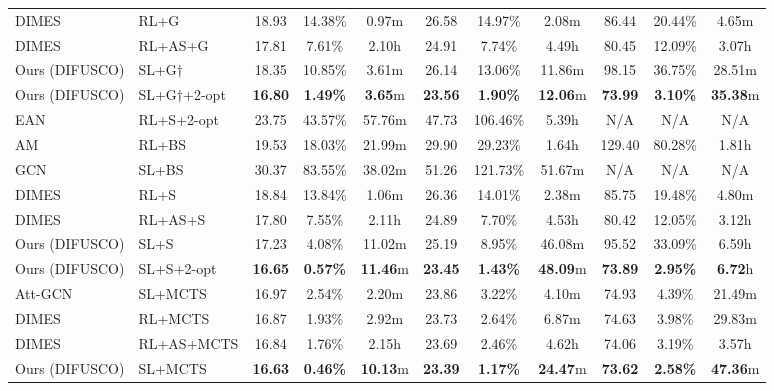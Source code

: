 \documentclass{article}
\theoremstyle{plain}
\theoremstyle{definition}
\theoremstyle{remark}
\newcommand{\method}{DIFUSCO}
\begin{document}
\begin{table}[t]
\begin{sc}
\begin{center}
{\begin{tabular}{ll|ccc|ccc|ccc}
DIMES &RL+G
&18.93 &14.38\% &0.97$\mathrm{m}$ & 26.58 & 14.97\% & 2.08$\mathrm{m}$ & 86.44 & 20.44\% & 4.65$\mathrm{m}$\\%
DIMES &RL+AS+G
&17.81&7.61\%&2.10$\mathrm{h}$&24.91&7.74\%&4.49$\mathrm{h}$        &80.45&12.09\%&3.07$\mathrm{h}$\\
Ours (\method) & SL+G$\dag$& 18.35 & 10.85\% & 3.61$\mathrm{m}$ 
& 26.14 & 13.06\% & 11.86$\mathrm{m}$
& 98.15 & 36.75\% & 28.51$\mathrm{m}$ \\
Ours (\method) & SL+G$\dag$+2-opt& \textbf{16.80} & \textbf{1.49\%} & \textbf{3.65$\mathrm{m}$}
& \textbf{23.56} & \textbf{1.90\%} & \textbf{12.06$\mathrm{m}$}
& \textbf{73.99} & \textbf{3.10\%} & \textbf{35.38$\mathrm{m}$}\\
\midrule
EAN&RL+S+2-opt%
&23.75&43.57\%&57.76$\mathrm{m}$&47.73&106.46\%&5.39$\mathrm{h}$      &N/A&N/A&N/A\\
AM&RL+BS%
&19.53&18.03\%&21.99$\mathrm{m}$&29.90&29.23\%&1.64$\mathrm{h}$       &129.40&80.28\%&1.81$\mathrm{h}$\\
GCN&SL+BS%
&30.37&83.55\%&38.02$\mathrm{m}$&51.26&121.73\%&51.67$\mathrm{m}$     &N/A&N/A&N/A\\
DIMES &RL+S
&18.84 &13.84\% &1.06$\mathrm{m}$ & 26.36 & 14.01\% & 2.38$\mathrm{m}$ & 85.75 &19.48\% & 4.80$\mathrm{m}$\\%
DIMES &RL+AS+S &17.80&7.55\%&2.11$\mathrm{h}$&24.89&7.70\%&4.53$\mathrm{h}$&80.42&12.05\%&3.12$\mathrm{h}$\\
Ours (\method) & SL+S & 17.23 & 4.08\% & 11.02$\mathrm{m}$
& 25.19 & 8.95\% & 46.08$\mathrm{m}$
& 95.52 & 33.09\% & 6.59$\mathrm{h}$ \\
Ours (\method) & SL+S+2-opt& \textbf{16.65} & \textbf{0.57\%} & \textbf{11.46$\mathrm{m}$}
& \textbf{23.45} & \textbf{1.43\%} & \textbf{48.09$\mathrm{m}$}
& \textbf{73.89} & \textbf{2.95\%} & \textbf{6.72$\mathrm{h}$}\\
\midrule
Att-GCN &SL+MCTS & 16.97 & 2.54\% & 2.20$\mathrm{m}$ & 23.86 & 3.22\% & 4.10$\mathrm{m}$ & 74.93 & 4.39\% & 21.49$\mathrm{m}$ \\
DIMES &RL+MCTS
& 16.87 & 1.93\% & 2.92$\mathrm{m}$ & 23.73 & 2.64\% & 6.87$\mathrm{m}$ & 74.63 & 3.98\% & 29.83$\mathrm{m}$\\%
DIMES &RL+AS+MCTS%
&{16.84} &{1.76\%} &2.15$\mathrm{h}$ 
&{23.69} &{2.46\%} &4.62$\mathrm{h}$ 
&{74.06} &{3.19\%} &3.57$\mathrm{h}$ 
\\
Ours (\method) & SL+MCTS
& \textbf{16.63} & \textbf{0.46\%} & \textbf{10.13$\mathrm{m}$}
& \textbf{23.39} & \textbf{1.17\%} & \textbf{24.47$\mathrm{m}$}
& \textbf{73.62} & \textbf{2.58\%} & \textbf{47.36$\mathrm{m}$}
\\
\bottomrule
\end{tabular}
}
\end{center}
\end{sc}
\vspace{-0.1in}
\end{table}
\setlength{\tabcolsep}{6pt}
\end{document}
